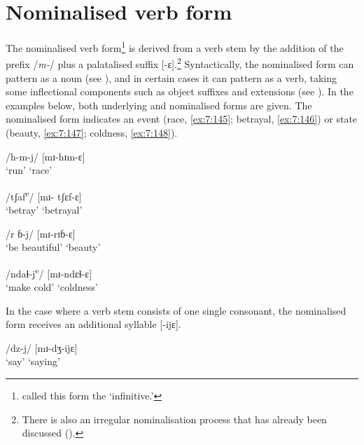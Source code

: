 \section{Nominalised verb form}\label{sec:7.6}
\hypertarget{RefHeading1212401525720847}{}
The nominalised verb form\footnote{\citet{FriesenMamalis2008} called this form the ‘infinitive.’} is derived from a verb stem by the addition of the prefix /\textit{m-}/ plus a palatalised suffix [{}-ɛ].\footnote{There is also an irregular nominalisation process that has already been discussed ().}  Syntactically, the nominalised form can pattern as a noun (see ), and in certain cases it can pattern as a verb, taking some inflectional components such as object suffixes and extensions (see ). In the examples below, both underlying and nominalised forms are given. The nominalised form indicates an event (race, \ref{ex:7:145};  betrayal, \ref{ex:7:146}) or state (beauty, \ref{ex:7:147};  coldness, \ref{ex:7:148}).  


\ea\label{ex:7:145}
 /h-m-j/ \hspace{40pt}    [mɪ-hɪm-ɛ]\\
\glt ‘run' \hspace{50pt}    ‘race’
\z 

\ea\label{ex:7:146}
/tʃaf\textsuperscript{e}/  \hspace{45pt}  [mɪ- tʃɛf-ɛ]\\
\glt  ‘betray’  \hspace{40pt}   ‘betrayal’
\z 

\ea\label{ex:7:147}
/r ɓ-j/  \hspace{45pt}  [mɪ-rɪɓ-ɛ]\\
\glt  ‘be beautiful’ \hspace{15pt} ‘beauty’
\z 

\ea\label{ex:7:148}
 /ndaɬ-j\textsuperscript{e}/  \hspace{34pt}  [mɪ-ndɛɬ-ɛ]\\
\glt  ‘make cold’ \hspace{25pt}   ‘coldness’
\z 

In the case where a verb stem consists of one single consonant, the nominalised form receives an additional syllable [{}-ijɛ].

\ea\label{ex:7:149}
/dz-j/  \hspace{55pt}  [mɪ-dʒ-ijɛ]\\
\glt ‘say’  \hspace{60pt}  ‘saying’
\z

